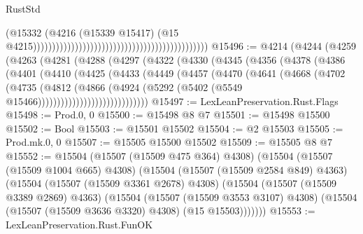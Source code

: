 \begin{lexlean}{RustStd}
\begin{coremodule}
                                                                                          (@15332
                                                                                            (@4216
                                                                                              (@15339
                                                                                                @15417)
                                                                                              (@15
                                                                                                @4215))))))))))))))))))))))))))))))))))))))))))))))
@15496 := @4214
    (@4244
      (@4259
        (@4263
          (@4281
            (@4288
              (@4297
                (@4322
                  (@4330
                    (@4345
                      (@4356
                        (@4378
                          (@4386
                            (@4401
                              (@4410
                                (@4425
                                  (@4433
                                    (@4449
                                      (@4457
                                        (@4470
                                          (@4641
                                            (@4668
                                              (@4702
                                                (@4735
                                                  (@4812
                                                    (@4866
                                                      (@4924
                                                        (@5292
                                                          (@5402
                                                            (@5549
                                                              @15466)))))))))))))))))))))))))))))
@15497 := LexLeanPreservation.Rust.Flags
@15498 := Prod.{0, 0}
@15500 := @15498 @8 @7
@15501 := @15498 @15500
@15502 := Bool
@15503 := @15501 @15502
@15504 := @2 @15503
@15505 := Prod.mk.{0, 0}
@15507 := @15505 @15500 @15502
@15509 := @15505 @8 @7
@15552 := @15504
    (@15507 (@15509 @475 @364) @4308)
    (@15504
      (@15507 (@15509 @1004 @665) @4308)
      (@15504
        (@15507 (@15509 @2584 @849) @4363)
        (@15504
          (@15507 (@15509 @3361 @2678) @4308)
          (@15504
            (@15507 (@15509 @3389 @2869) @4363)
            (@15504
              (@15507 (@15509 @3553 @3107) @4308)
              (@15504 (@15507 (@15509 @3636 @3320) @4308) (@15 @15503)))))))
@15553 := LexLeanPreservation.Rust.FunOK

\end{coremodule}
\end{lexlean}
